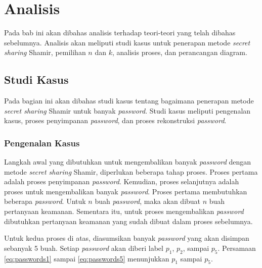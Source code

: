 \chapter{Analisis}
\label{chap:analisis}

Pada bab ini akan dibahas analisis terhadap teori-teori yang telah dibahas sebelumnya. Analisis akan meliputi studi kasus untuk penerapan metode \textit{secret sharing} Shamir, pemilihan \begin{math}n\end{math} dan \begin{math}k\end{math}, analisis proses, dan perancangan diagram.

\section{Studi Kasus}

Pada bagian ini akan dibahas studi kasus tentang bagaimana penerapan metode \textit{secret sharing} Shamir untuk banyak \textit{password}. Studi kasus meliputi pengenalan kasus, proses penyimpanan \textit{password}, dan proses rekonstruksi \textit{password}.

\subsection{Pengenalan Kasus}\label{subsec:pengenalankasus}

Langkah awal yang dibutuhkan untuk mengembalikan banyak \textit{password} dengan metode \textit{secret sharing} Shamir, diperlukan beberapa tahap proses. Proses pertama adalah proses penyimpanan \textit{password}. Kemudian, proses selanjutnya adalah proses untuk mengembalikan banyak \textit{password}. Proses pertama membutuhkan beberapa \textit{password}. Untuk \begin{math}n\end{math} buah \textit{password}, maka akan dibuat \begin{math}n\end{math} buah pertanyaan keamanan. Sementara itu, untuk proses mengembalikan \textit{password} dibutuhkan pertanyaan keamanan yang sudah dibuat dalam proses sebelumnya.

Untuk kedua proses di atas, diasumsikan banyak \textit{password} yang akan disimpan sebanyak 5 buah. Setiap \textit{password} akan diberi label \begin{math}p_1\end{math}, \begin{math}p_2\end{math}, sampai \begin{math}p_5\end{math}. Persamaan \ref{eq:passwords1} sampai \ref{eq:passwords5} menunjukkan \begin{math}p_1\end{math} sampai \begin{math}p_5\end{math}.


